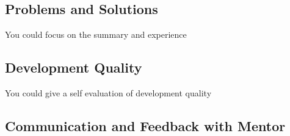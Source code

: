 \subsection{Problems and Solutions}  
You could focus on the summary and experience
\subsection{Development Quality}
You could give a self evaluation of development quality
\subsection{Communication and Feedback with Mentor}

